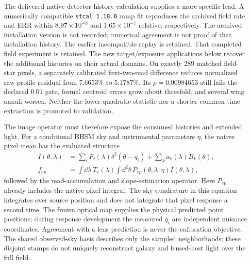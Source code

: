 The delivered native detector-history calculation supplies a more specific
lead. A numerically compatible \texttt{stcal 1.18.0} ramp fit reproduces
the archived field rate and ERR within $8.97\times10^{-8}$ and
$1.65\times10^{-7}$ relative, respectively. The archived installation
version is not recorded; numerical agreement is not proof of that
installation history. The earlier incompatible replay is retained.
That completed field experiment is retained. The new target/exposure
applications below recover the additional histories on their actual domains.
On exactly 289 matched field-star pixels, a separately calibrated
first-two-read difference reduces normalized raw profile residual from
$7.6653\%$ to $5.1787\%$. Its $p=0.00984653$ still fails the declared
$0.01$ gate, formal centroid errors grow about threefold, and several
wing annuli worsen. Neither the lower quadratic statistic nor a
shorter common-time extraction is promoted to validation.

The image operator must therefore expose the consumed histories and
extended light. For a conditional BHSM sky and instrumental parameters
$\eta$, the native pixel mean has the evaluated structure
\begin{align}
 I(\theta,\lambda)&=\sum_i F_i(\lambda)
          \delta^2(\theta-q_i)+\sum_k a_k(\lambda)B_k(\theta),\nonumber\\
 f_{ep}&=\int\!\dd\lambda\,T_e(\lambda)
            \int\!\dd^2\theta\,
            P_{ep}(\theta,\lambda;\eta)I(\theta,\lambda),
 \label{eq:he0435-scene-native-operator}
\end{align}
followed by the read-accumulation and slope-estimation operator.
Here $P_{ep}$ already includes the native pixel integral. The sky
quadrature in this equation integrates over source position and does
not integrate that pixel response a second time. The frozen optical
map supplies the physical predicted point positions; during response
development the measured $q_i$ are independent nuisance coordinates.
Agreement with a lens prediction is never the calibration objective.
The shared observed-sky basis describes only the sampled neighborhoods;
these disjoint stamps do not uniquely reconstruct galaxy and lensed-host
light over the full field.

